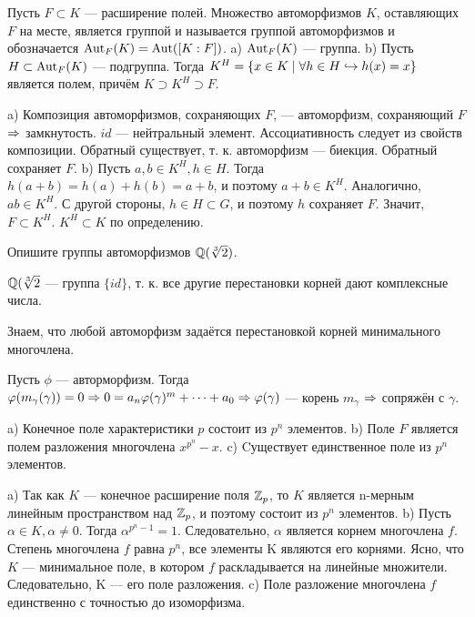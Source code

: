 \begin{problem}
Пусть $F \subset K$ — расширение полей. Множество автоморфизмов $K$, оставляющих $F$ на месте, является группой и называется группой автоморфизмов и обозначается $\operatorname{Aut}_F(K) = \operatorname{Aut}([K : F])$.
a) $\operatorname{Aut}_F(K)$ — группа.
b) Пусть $H \subset \operatorname{Aut}_F(K)$ --- подгруппа. Тогда $K^H = \{x \in K \mid \forall h \in H \hookrightarrow h(x) = x\}$ является полем, причём $K \supset K^H \supset F$.
\end{problem}

\begin{solution}
a) Композиция автоморфизмов, сохраняющих \(F\), --- автоморфизм, сохраняющий \(F\) \(\Rightarrow\) замкнутость.
\(id\) --- нейтральный элемент.
Ассоциативность следует из свойств композиции.
Обратный существует, т. к. автоморфизм --- биекция. Обратный сохраняет \(F\).
b) Пусть \(a, b \in K^H, h \in H\). Тогда \(h(a + b) = h(a) + h(b) = a + b\), и поэтому \(a + b \in K^H\). Аналогично, \(ab \in K^H\). С другой стороны, \(h \in H \subset G\), и поэтому \(h\) сохраняет \(F\). Значит, \(F \subset K^H\).
\(K^H \subset K\) по определению.

\end{solution}

\begin{problem}[42 (10.5)]
Опишите группы автоморфизмов $\mathbb{Q}(\sqrt[3]{2})$.
\end{problem}

\begin{solution}
\(\mathbb{Q}(\sqrt[3]{2}\) --- группа \(\{id\}\), т. к. все другие перестановки корней дают комплексные числа.

Знаем, что любой автоморфизм задаётся перестановкой корней минимального многочлена.

Пусть \(\phi\) --- авторморфизм. Тогда \(\varphi(m_\gamma(\gamma)) = 0 \Rightarrow 0 = a_n \varphi(\gamma)^m+\dots+a_0 \Rightarrow \varphi(\gamma)\) --- корень \(m_\gamma\) \(\Rightarrow\) сопряжён с \(\gamma\).
\end{solution}

\begin{problem}
a) Конечное поле характеристики $p$ состоит из $p^n$ элементов. 
b) Поле $F$ является полем разложения многочлена $x^{p^n}-x$. 
c) Cуществует единственное поле из $p^n$ элементов.
\end{problem}

\begin{solution}
a) Так как \(K\) --- конечное расширение поля \(\mathbb{Z}_p\), то \(K\) является n-мерным линейным пространством над \(\mathbb{Z}_p\), и поэтому состоит из \(p^n\) элементов.
b) Пусть \(\alpha \in K, \alpha \ne 0\). Тогда \(\alpha^{p^n-1} = 1\). Следовательно, \(\alpha\) является корнем многочлена \(f\). Степень многочлена \(f\) равна \(p^n\), все элементы K являются его корнями. Ясно, что \(K\) --- минимальное поле, в котором \(f\) раскладывается на линейные множители. Следовательно, K --- его поле разложения.
c) Поле разложение многочлена \(f\) единственно с точностью до изоморфизма.

\end{solution}

